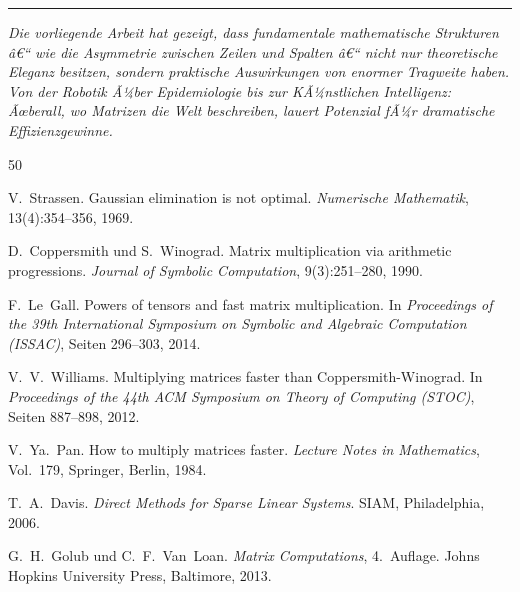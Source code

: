 ﻿\documentclass[a4paper,12pt]{report}
\theoremstyle{definition}
\begin{document}
	\vspace{1cm}
	
	\begin{center}
		\rule{0.5\textwidth}{0.4pt}
	\end{center}
	
	\vspace{0.5cm}
	
	\textit{Die vorliegende Arbeit hat gezeigt, dass fundamentale mathematische Strukturen â€“ wie die Asymmetrie zwischen Zeilen und Spalten â€“ nicht nur theoretische Eleganz besitzen, sondern praktische Auswirkungen von enormer Tragweite haben. Von der Robotik Ã¼ber Epidemiologie bis zur KÃ¼nstlichen Intelligenz: Ãœberall, wo Matrizen die Welt beschreiben, lauert Potenzial fÃ¼r dramatische Effizienzgewinne.}

\begin{thebibliography}{50}

V.~Strassen.
\newblock Gaussian elimination is not optimal.
\newblock \textit{Numerische Mathematik}, 13(4):354--356, 1969.

D.~Coppersmith und S.~Winograd.
\newblock Matrix multiplication via arithmetic progressions.
\newblock \textit{Journal of Symbolic Computation}, 9(3):251--280, 1990.

F.~Le~Gall.
\newblock Powers of tensors and fast matrix multiplication.
\newblock In \textit{Proceedings of the 39th International Symposium on Symbolic and Algebraic Computation (ISSAC)}, Seiten 296--303, 2014.

V.~V.~Williams.
\newblock Multiplying matrices faster than Coppersmith-Winograd.
\newblock In \textit{Proceedings of the 44th ACM Symposium on Theory of Computing (STOC)}, Seiten 887--898, 2012.

V.~Ya.~Pan.
\newblock How to multiply matrices faster.
\newblock \textit{Lecture Notes in Mathematics}, Vol.~179, Springer, Berlin, 1984.

T.~A.~Davis.
\newblock \textit{Direct Methods for Sparse Linear Systems}.
\newblock SIAM, Philadelphia, 2006.

G.~H.~Golub und C.~F.~Van~Loan.
\newblock \textit{Matrix Computations}, 4.~Auflage.
\newblock Johns Hopkins University Press, Baltimore, 2013.


\end{thebibliography}
\end{document}
